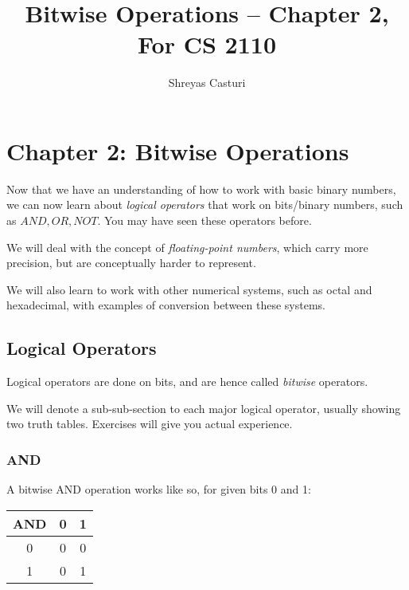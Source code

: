 \documentclass[12pt]{article}
\title{Bitwise Operations -- Chapter 2, For CS 2110}
\author{Shreyas Casturi}
\date{}
\begin{document}
\maketitle

\newpage
\doublespacing
\tableofcontents
\singlespacing

\newpage

\section{Chapter 2: Bitwise Operations}

Now that we have an understanding of how to work
with basic binary numbers, we can now learn about
\textit{logical operators} that work on
bits/binary numbers, such as $AND, OR, NOT$. You may have seen these operators
before.

We will deal with the concept of \textit{floating-point numbers},
which carry more precision, but are conceptually harder
to represent.

We will also learn to work with other numerical
systems, such as octal and hexadecimal, with examples of conversion between these systems.

\subsection{Logical Operators}

Logical operators are done on bits, and are hence called \textit{bitwise} operators.

We will denote a sub-sub-section to each major
logical operator, usually showing two truth tables. Exercises
will give you actual experience.

\subsubsection{AND}

A bitwise AND operation works like so,
for given bits 0 and 1:

\begin{center}
    
    \begin{tabular}{|c|c|c|}
      \hline
    AND & 0 & 1 \\
    \hline
      0 & 0 & 0 \\
      \hline
    1 & 0 & 1 \\
    \hline
    \end{tabular}
   
\end{center}
\end{document}
